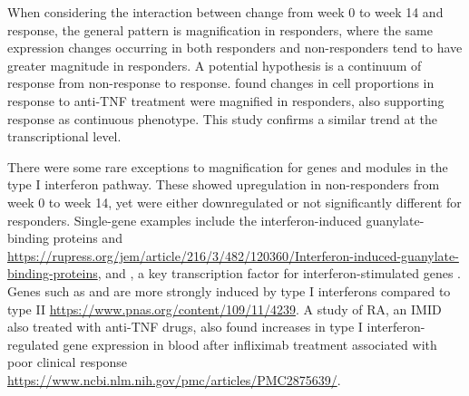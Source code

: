 When considering the interaction between change from week 0 to week 14 and response,
the general pattern is magnification in responders,
where the same expression changes occurring in both responders and non-responders tend to have greater magnitude in responders.
A potential hypothesis is a continuum of response from non-response to response.
\textcite{gaujoux2019CellcentredMetaanalysisReveals} found changes in cell proportions in response to anti-\gls{TNF} treatment were magnified in responders, 
also supporting response as continuous phenotype.
This study confirms a similar trend at the transcriptional level.


There were some rare exceptions to magnification for genes and modules in the type I interferon pathway.
These showed upregulation in non-responders from week 0 to week 14,
yet were either downregulated or not significantly different for responders.
Single-gene examples include the interferon-induced guanylate-binding proteins  and  \url{https://rupress.org/jem/article/216/3/482/120360/Interferon-induced-guanylate-binding-proteins}, 
and , a key transcription factor for interferon-stimulated genes \autocite{schneider2014InterferonStimulatedGenesComplex}.
Genes such as  and  are more strongly induced by type I interferons compared to type II \url{https://www.pnas.org/content/109/11/4239}.
A study of \gls{RA},
an \gls{IMID} also treated with anti-\gls{TNF} drugs,
also found increases in type I interferon-regulated gene expression in blood after infliximab treatment associated with poor clinical response \url{https://www.ncbi.nlm.nih.gov/pmc/articles/PMC2875639/}.

